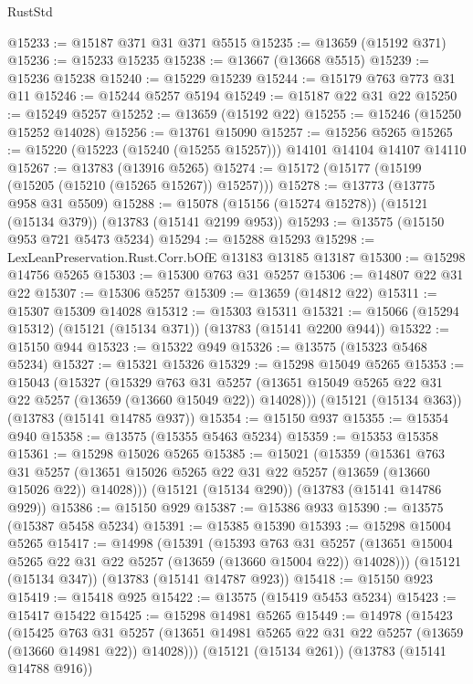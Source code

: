 \begin{lexlean}{RustStd}
\begin{coremodule}
@15233 := @15187 @371 @31 @371 @5515
@15235 := @13659 (@15192 @371)
@15236 := @15233 @15235
@15238 := @13667 (@13668 @5515)
@15239 := @15236 @15238
@15240 := @15229 @15239
@15244 := @15179 @763 @773 @31 @11
@15246 := @15244 @5257 @5194
@15249 := @15187 @22 @31 @22
@15250 := @15249 @5257
@15252 := @13659 (@15192 @22)
@15255 := @15246 (@15250 @15252 @14028)
@15256 := @13761 @15090
@15257 := @15256 @5265
@15265 := @15220 (@15223 (@15240 (@15255 @15257))) @14101 @14104 @14107 @14110
@15267 := @13783 (@13916 @5265)
@15274 := @15172 (@15177 (@15199 (@15205 (@15210 (@15265 @15267)) @15257)))
@15278 := @13773 (@13775 @958 @31 @5509)
@15288 := @15078 (@15156 (@15274 @15278)) (@15121 (@15134 @379)) (@13783 (@15141 @2199 @953))
@15293 := @13575 (@15150 @953 @721 @5473 @5234)
@15294 := @15288 @15293
@15298 := LexLeanPreservation.Rust.Corr.bOfE @13183 @13185 @13187
@15300 := @15298 @14756 @5265
@15303 := @15300 @763 @31 @5257
@15306 := @14807 @22 @31 @22
@15307 := @15306 @5257
@15309 := @13659 (@14812 @22)
@15311 := @15307 @15309 @14028
@15312 := @15303 @15311
@15321 := @15066 (@15294 @15312) (@15121 (@15134 @371)) (@13783 (@15141 @2200 @944))
@15322 := @15150 @944
@15323 := @15322 @949
@15326 := @13575 (@15323 @5468 @5234)
@15327 := @15321 @15326
@15329 := @15298 @15049 @5265
@15353 := @15043
    (@15327
      (@15329
        @763
        @31
        @5257
        (@13651 @15049 @5265 @22 @31 @22 @5257 (@13659 (@13660 @15049 @22)) @14028)))
    (@15121 (@15134 @363))
    (@13783 (@15141 @14785 @937))
@15354 := @15150 @937
@15355 := @15354 @940
@15358 := @13575 (@15355 @5463 @5234)
@15359 := @15353 @15358
@15361 := @15298 @15026 @5265
@15385 := @15021
    (@15359
      (@15361
        @763
        @31
        @5257
        (@13651 @15026 @5265 @22 @31 @22 @5257 (@13659 (@13660 @15026 @22)) @14028)))
    (@15121 (@15134 @290))
    (@13783 (@15141 @14786 @929))
@15386 := @15150 @929
@15387 := @15386 @933
@15390 := @13575 (@15387 @5458 @5234)
@15391 := @15385 @15390
@15393 := @15298 @15004 @5265
@15417 := @14998
    (@15391
      (@15393
        @763
        @31
        @5257
        (@13651 @15004 @5265 @22 @31 @22 @5257 (@13659 (@13660 @15004 @22)) @14028)))
    (@15121 (@15134 @347))
    (@13783 (@15141 @14787 @923))
@15418 := @15150 @923
@15419 := @15418 @925
@15422 := @13575 (@15419 @5453 @5234)
@15423 := @15417 @15422
@15425 := @15298 @14981 @5265
@15449 := @14978
    (@15423
      (@15425
        @763
        @31
        @5257
        (@13651 @14981 @5265 @22 @31 @22 @5257 (@13659 (@13660 @14981 @22)) @14028)))
    (@15121 (@15134 @261))
    (@13783 (@15141 @14788 @916))

\end{coremodule}
\end{lexlean}
